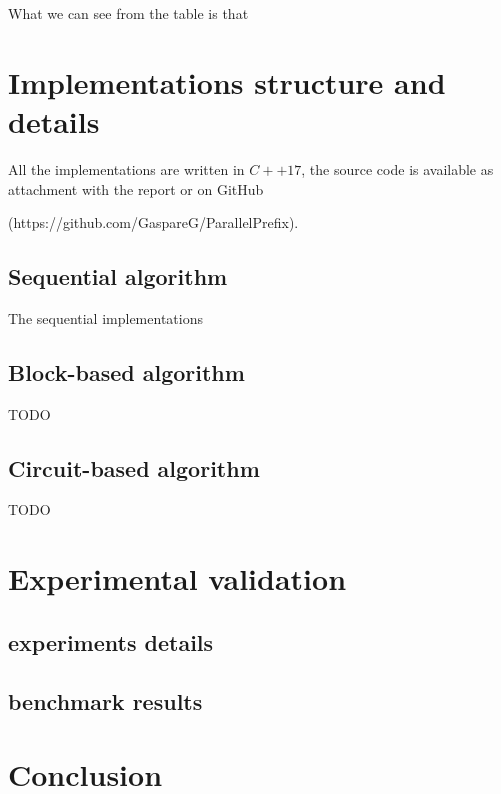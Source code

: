 \documentclass{article}
\begin{document}
What we can see from the table is that 

\section{Implementations structure and details}

All the implementations are written in $C++17$, the source code is available as attachment with the report or on GitHub

 (https://github.com/GaspareG/ParallelPrefix).


\subsection{Sequential algorithm}

The sequential implementations 

\subsection{Block-based algorithm}

TODO

\subsection{Circuit-based algorithm}

TODO

\section{Experimental validation}


\subsection{experiments details}

\subsection{benchmark results}

\section{Conclusion}


\end{document}
